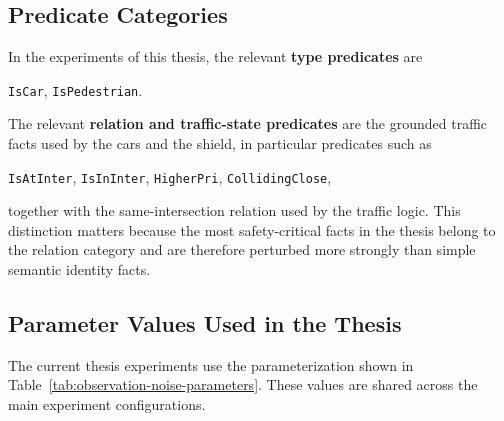 \subsection{Predicate Categories}

In the experiments of this thesis, the relevant \textbf{type predicates} are
\begin{center}
\texttt{IsCar}, \texttt{IsPedestrian}.
\end{center}

\noindent The relevant \textbf{relation and traffic-state predicates} are the grounded traffic facts used by the cars and the shield, in particular predicates such as
\begin{center}
\texttt{IsAtInter}, \texttt{IsInInter}, \texttt{HigherPri}, \texttt{CollidingClose},
\end{center}
\noindent together with the same-intersection relation used by the traffic logic. This distinction matters because the most safety-critical facts in the thesis belong to the relation category and are therefore perturbed more strongly than simple semantic identity facts.

\subsection{Parameter Values Used in the Thesis}

The current thesis experiments use the parameterization shown in Table~\ref{tab:observation-noise-parameters}. These values are shared across the main experiment configurations.

